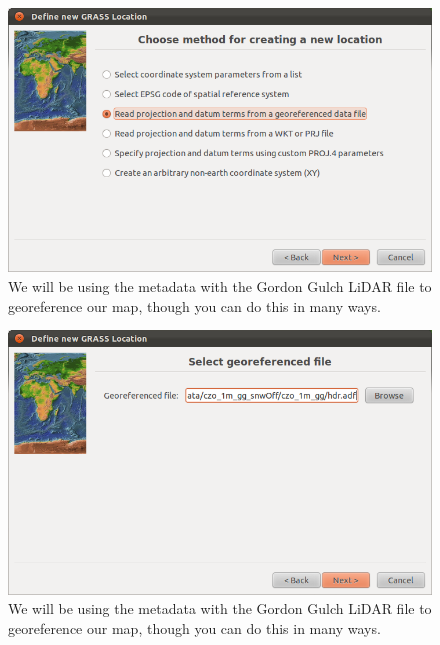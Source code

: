 \documentclass{book}
\begin{document}
\begin{figure}[h]
 \begin{center}
 \includegraphics[width=.9\linewidth]{figures/ubuntu/location_wizard_method.png}
 \caption{We will be using the metadata with the Gordon Gulch LiDAR file to georeference our map, though you can do this in many ways.}
 \label{fig:location_wizard_method}
 \end{center}
\end{figure}

\begin{figure}[h]
 \begin{center}
 \includegraphics[width=.9\linewidth]{figures/ubuntu/location_wizard_import_georeferencing.png}
 \caption{We will be using the metadata with the Gordon Gulch LiDAR file to georeference our map, though you can do this in many ways.}
 \label{fig:location_wizard_import_georeferencing}
 \end{center}
\end{figure}
\end{document}
